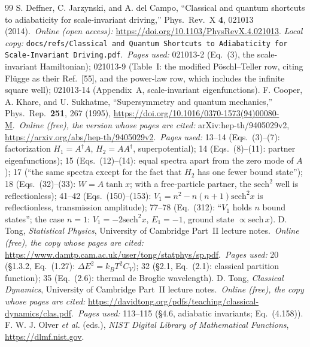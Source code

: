 \documentclass[11pt]{article}
\numberwithin{equation}{section}
\newcommand{\kB}{k_{B}}
\begin{document}
\begin{thebibliography}{99}
 S. Deffner, C. Jarzynski, and A. del Campo, ``Classical and quantum shortcuts to adiabaticity for scale-invariant driving,'' Phys.\ Rev.\ X \textbf{4}, 021013 (2014).\
\emph{Online (open access):} \url{https://doi.org/10.1103/PhysRevX.4.021013}. \emph{Local copy:} \texttt{docs/refs/Classical and Quantum Shortcuts to Adiabaticity for Scale-Invariant Driving.pdf}.\
\emph{Pages used:} 021013-2 (Eq.~(3), the scale-invariant Hamiltonian); 021013-9 (Table~I: the modified P\"oschl--Teller row, citing Fl\"ugge as their Ref.~[55], and the power-law row, which includes the infinite square well); 021013-14 (Appendix~A, scale-invariant eigenfunctions).
\bibitem{CKS} F. Cooper, A. Khare, and U. Sukhatme, ``Supersymmetry and quantum mechanics,'' Phys.\ Rep.\ \textbf{251}, 267 (1995), \url{https://doi.org/10.1016/0370-1573(94)00080-M}.\
\emph{Online (free), the version whose pages are cited:} arXiv:hep-th/9405029v2, \url{https://arxiv.org/abs/hep-th/9405029v2}.\
\emph{Pages used:} 13--14 (Eqs.~(3)--(7): factorization $H_1=A^\dagger A$, $H_2=AA^\dagger$, superpotential); 14 (Eqs.~(8)--(11): partner eigenfunctions); 15 (Eqs.~(12)--(14): equal spectra apart from the zero mode of $A$); 17 (``the same spectra except for the fact that $H_2$ has one fewer bound state''); 18 (Eqs.~(32)--(33): $W=A\tanh x$; with a free-particle partner, the $\mathrm{sech}^2$ well is reflectionless); 41--42 (Eqs.~(150)--(153): $V_1=n^2-n(n+1)\mathrm{sech}^2x$ is reflectionless, transmission amplitude); 77--78 (Eq.~(312): ``$V_1$ holds $n$ bound states''; the case $n=1$: $V_1=-2\mathrm{sech}^2x$, $E_1=-1$, ground state $\propto\mathrm{sech}\,x$).
\bibitem{tongSP} D. Tong, \emph{Statistical Physics}, University of Cambridge Part~II lecture notes.\
\emph{Online (free), the copy whose pages are cited:} \url{https://www.damtp.cam.ac.uk/user/tong/statphys/sp.pdf}.\
\emph{Pages used:} 20 (\S1.3.2, Eq.~(1.27): $\Delta E^2=\kB T^2C_V$); 32 (\S2.1, Eq.~(2.1): classical partition function); 35 (Eq.~(2.6): thermal de Broglie wavelength).
\bibitem{tongCD} D. Tong, \emph{Classical Dynamics}, University of Cambridge Part~II lecture notes.\
\emph{Online (free), the copy whose pages are cited:} \url{https://davidtong.org/pdfs/teaching/classical-dynamics/clas.pdf}.\
\emph{Pages used:} 113--115 (\S4.6, adiabatic invariants; Eq.~(4.158)).
\bibitem{dlmf} F. W. J. Olver \emph{et al.} (eds.), \emph{NIST Digital Library of Mathematical Functions}, \url{https://dlmf.nist.gov}.\

\end{thebibliography}
\end{document}
